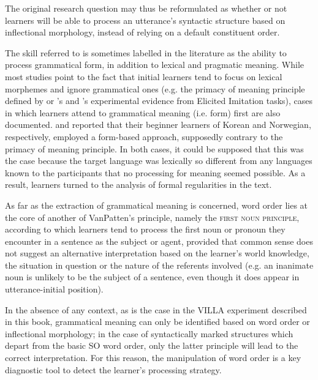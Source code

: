 The original research question may thus be reformulated as whether or not learners will be able to process an utterance’s syntactic structure based on inflectional morphology, instead of relying on a default constituent order. 

The skill referred to is sometimes labelled in the literature as the ability to process grammatical form, in addition to lexical and pragmatic meaning. While most studies point to the fact that initial learners tend to focus on lexical morphemes and ignore grammatical ones (e.g. the primacy of meaning principle defined by \citet{VanPatten1996} or 's \citeyear{Klein1986} and 's \citeyear{Rast2008} experimental evidence from Elicited Imitation tasks), cases in which learners attend to grammatical meaning (i.e. form) first are also documented. \citet{Park2013} and \citet{HanPeverly2007} reported that their beginner learners of Korean and Norwegian, respectively, employed a form-based approach, supposedly contrary to the primacy of meaning principle. In both cases, it could be supposed that this was the case because the target language was lexically so different from any languages known to the participants that no processing for meaning seemed possible. As a result, learners turned to the analysis of formal regularities in the text.

As far as the extraction of grammatical meaning is concerned, word order lies at the core of another of VanPatten’s principle, namely the \textsc{first} \textsc{noun} \textsc{principle}, according to which learners tend to process the first noun or pronoun they encounter in a sentence as the subject or agent, provided that common sense does not suggest an alternative interpretation based on the learner’s world knowledge, the situation in question or the nature of the referents involved (e.g. an inanimate noun is unlikely to be the subject of a sentence, even though it does appear in utterance-initial position). 

In the absence of any context, as is the case in the VILLA experiment described in this book, grammatical meaning can only be identified based on word order or inflectional morphology; in the case of syntactically marked structures which depart from the basic SO word order, only the latter principle will lead to the correct interpretation. For this reason, the manipulation of word order is a key diagnostic tool to detect the learner's processing strategy.

